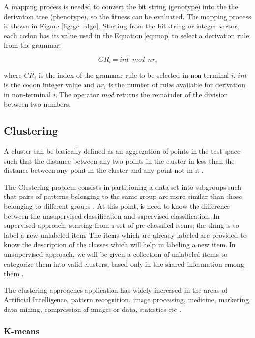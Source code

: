 \documentclass[journal]{IEEEtran}
\begin{document}
A mapping process is needed to convert the bit string (genotype) into the the derivation tree (phenotype), so the fitness can be evaluated. The mapping process is shown in Figure \ref{fig:ge_algo}. Starting from the bit string or integer vector, each codon has its value used in the Equation \ref{eq:map} to select a derivation rule from the grammar:

\begin{equation}\label{eq:map}
GR_i = int~~mod~~nr_i
\end{equation}

where $GR_i$ is the index of the grammar rule to be selected in non-terminal $i$, $int$ is the codon integer value and $nr_i$ is the number of rules available for derivation in non-terminal $i$. The operator $mod$ returns the remainder of the division between two numbers.

\subsection{Clustering}

A cluster can be basically defined as an aggregation of points in the test space such that the distance between any two points in the cluster in less than the distance between any point in the cluster and any point not in it \cite{jain1988algorithms}.

The Clustering problem consists in partitioning a data set into subgroups such that pairs of patterns belonging to the same group are more similar than those belonging to different groups \cite{boric2007genetic}. At this point, is need to know the difference between the unsupervised classification and supervised classification. In supervised approach, starting from a set of pre-classified items; the thing is to label a new unlabeled item. The items which are already labeled are provided to know the description of the classes which will help in labeling a new item. In unsupervised approach, we will be given a collection of unlabeled items to categorize them into valid clusters, based only in the shared information among them \cite{ahalya2015data}.

The clustering approaches application has widely increased in the
areas of Artificial Intelligence, pattern recognition, image processing,
medicine, marketing, data mining, compression of images or data,
statistics etc \cite{ahalya2015data}.

\subsubsection{K-means}
\end{document}
